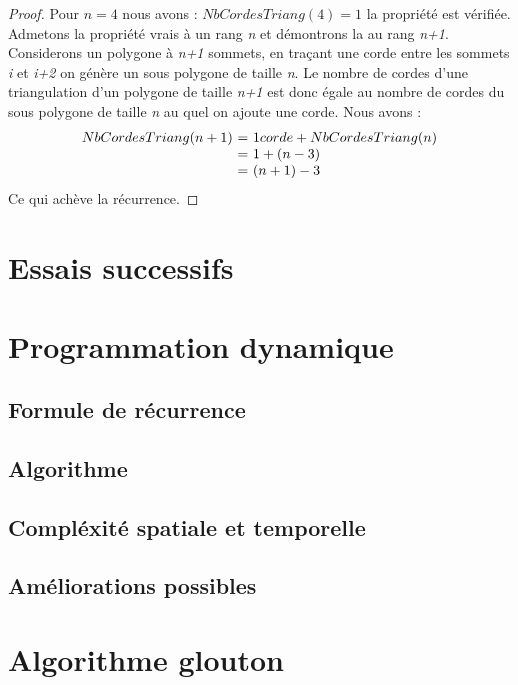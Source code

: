 \documentclass[a4paper,10pt]{article}
\begin{document}
\begin{proof}
Pour \(n = 4\) nous avons : \(NbCordesTriang(4) = 1 \) la propriété est vérifiée. \\
Admetons la propriété vrais à un rang \emph{n} et démontrons la au rang \emph{n+1}. \\
Considerons un polygone à \emph{n+1} sommets, en traçant une corde entre les sommets \emph{i} et \emph{i+2} on génère un sous polygone de taille \emph{n}.
Le nombre de cordes d'une triangulation d'un polygone de taille \emph{n+1} est donc égale au nombre de cordes du sous polygone de taille \emph{n} au quel on ajoute une corde.
Nous avons :\\
\[
\begin{array}{r @{=} l}
NbCordesTriang(n+1) \ & \  1 corde + NbCordesTriang(n) \\
			  & \ 1 + (n-3) \\
			  & \ (n+1) - 3
\end{array}
\]
Ce qui achève la récurrence.
\end{proof}


\section{Essais successifs}

\section{Programmation dynamique}

\subsection{Formule de récurrence}

\subsection{Algorithme}

\subsection{Compléxité spatiale et temporelle}

\subsection{Améliorations possibles}

\section{Algorithme glouton}
\end{document}
